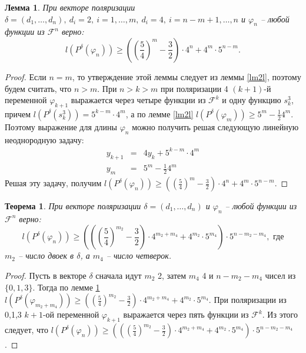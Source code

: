 \documentclass[bibliography=totoc, a4paper, 14pt]{extarticle}
\newtheorem{myth}{Теорема}
\newtheorem{mylm}{Лемма}
\newtheorem*{myco}{Следствие}
\newcommand{\pphi}[1] {P^{\delta}(\varphi_{#1})}
\begin{document}
\begin{mylm}
\label{lm24l}
При векторе поляризации $\delta=(d_1,\dots,d_n),\ d_i = 2,\ i=1,\dots,m,\ d_i=4,{\ i=n-m+1,\dots,n}$
и $\varphi_n$ -- любой функции из $\mathcal{F}^n$ верно:
$$l(\pphi{n})\geqslant\left(\left(\frac{5}{4}\right)^m-\frac{3}{2}\right)\cdot4^n+4^m\cdot5^{n-m}.$$
\end{mylm}
\begin{proof}
Если $n=m$, то утверждение этой леммы следует из леммы \ref{lm2l}, поэтому будем считать, что $n>m$.
При $n > k > m$ при поляризации 4 $(k+1)$-й переменной $\varphi_{k+1}$ выражается через четыре функции
из $\mathcal{F}^k$ и одну функцию $s^3_k$, причем $l(P^{\delta}(s^3_k)) = 5^{k-m} \cdot 4^m$, а по
лемме \ref{lm2l} $l(\pphi{m}) \geqslant 5^m - \frac{1}{2}4^m$. Поэтому выражение для длины
$\varphi_n$ можно получить решая следующую линейную неоднородную задачу:
$$ \begin{array}{lcl}
y_{k+1} &=& 4 y_k + 5^{k-m}\cdot 4^m \\
y_m     &=& 5^m - \frac{1}{2}4^m
\end{array} $$
Решая эту задачу, получим $l(\pphi{n}) \geqslant \left(\left(\frac{5}{4}\right)^m -
    \frac{3}{2}\right)\cdot 4^n + 4^m \cdot 5^{n-m}$.
\end{proof}

\begin{myth}
При векторе поляризации $\delta=(d_1,\dots,d_n)$ и $\varphi_n$ -- любой функции из
$\mathcal{F}^n$ верно: $$l(\pphi{n}) \geqslant \left(\left(\left(\frac{5}{4}\right)^{m_2}-
\frac{3}{2}\right) \cdot 4^{m_2+m_4}+4^{m_2}\cdot 5^{m_4} \right) \cdot 5^{n-m_2-m_4},\text{ где}$$
$m_2$ -- число двоек в $\delta$, а $m_4$ -- число четверок.
\end{myth}
\begin{proof}
Пусть в векторе $\delta$ сначала идут $m_2$ 2, затем $m_4$ 4 и $n-m_2-m_4$ чисел из $\{0,1,3\}$.
Тогда по лемме \ref{lm24l} $l(\pphi{m_2+m_4}) \geqslant \left(\left(\frac{5}{4}\right)^{m_2}
- \frac{3}{2}\right)\cdot 4^{m_2+m_4} + 4^{m_2} \cdot 5^{m_4}$. При поляризации из {0,1,3} $k+1$-ой
переменной $\varphi_{k+1}$ выражается через пять функции из $\mathcal{F}^k$. Из этого следует, что
${l(\pphi{n}) \geqslant \left(\left(\left(\frac{5}{4}\right)^{m_2}-\frac{3}{2}\right) \cdot
4^{m_2+m_4}+4^{m_2} \cdot 5^{m_4} \right) \cdot 5^{n-m_2-m_4}}$.
\end{proof}

\end{document}
